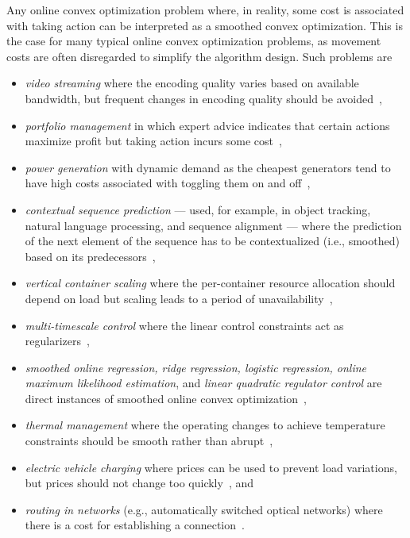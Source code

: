 Any online convex optimization problem where, in reality, some cost is associated with taking action can be interpreted as a smoothed convex optimization. This is the case for many typical online convex optimization problems, as movement costs are often disregarded to simplify the algorithm design. Such problems are

\begin{itemize}
    \item \emph{video streaming} where the encoding quality varies based on available bandwidth, but frequent changes in encoding quality should be avoided~\cite{Lin2012},
    \item \emph{portfolio management} in which expert advice indicates that certain actions maximize profit but taking action incurs some cost~\cite{Calafiore2008, Das2014, Ballu2019},
    \item \emph{power generation} with dynamic demand as the cheapest generators tend to have high costs associated with toggling them on and off~\cite{Lin2012, Badiei2015},
    \item \emph{contextual sequence prediction} --- used, for example, in object tracking, natural language processing, and sequence alignment --- where the prediction of the next element of the sequence has to be contextualized (i.e., smoothed) based on its predecessors~\cite{Kim2015},
    \item \emph{vertical container scaling} where the per-container resource allocation should depend on load but scaling leads to a period of unavailability~\cite{Rossi2019},
    \item \emph{multi-timescale control} where the linear control constraints act as regularizers~\cite{Goel2017},
    \item \emph{smoothed online regression, ridge regression, logistic regression, online maximum likelihood estimation}, and \emph{linear quadratic regulator control} are direct instances of smoothed online convex optimization~\cite{Goel2018, Goel2019_2, Shi2020},
    \item \emph{thermal management} where the operating changes to achieve temperature constraints should be smooth rather than abrupt~\cite{Zanini2009},
    \item \emph{electric vehicle charging} where prices can be used to prevent load variations, but prices should not change too quickly~\cite{Kim2014}, and
    \item \emph{routing in networks} (e.g., automatically switched optical networks) where there is a cost for establishing a connection~\cite{Lin2012}.
\end{itemize}